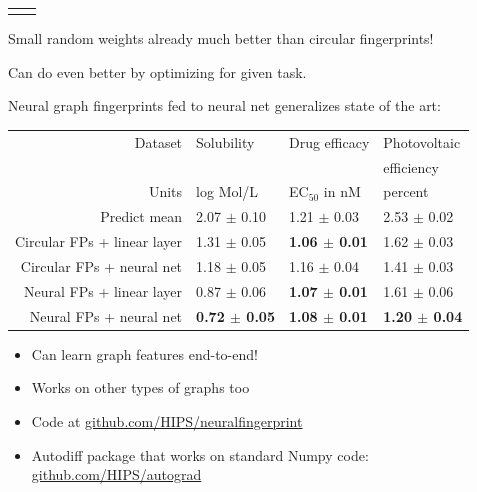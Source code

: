 \documentclass[landscape,a0b,final,a4resizeable]{include/a0poster}
\begin{document}
\begin{poster}
\begin{multicols}{3}
\begin{tabular}{cc}
\begin{minipage}[c]{0.48\columnwidth}
\begin{center}
\end{center}
\end{minipage}
\end{tabular}

\vspace{0.5em}

Small random weights already much better than circular fingerprints!

Can do even better by optimizing for given task.

\vspace{1in}


Neural graph fingerprints fed to neural net generalizes state of the art:%

\vspace{0.5em}

\begin{center}
\begin{tabular}{r|lll}
Dataset                      &   Solubility  & Drug efficacy & Photovoltaic \\
 & & & efficiency \\
\midrule
Units                        &   log Mol/L                            & EC$_{50}$ in nM                        & percent \\
\midrule
Predict mean                 & 2.07 $\pm$ 0.10        & 1.21 $\pm$ 0.03         & 2.53 $\pm$ 0.02 \\
Circular FPs + linear layer  & 1.31 $\pm$ 0.05        & \bf{1.06} $\pm$ 0.01    & 1.62 $\pm$ 0.03 \\
Circular FPs + neural net    & 1.18 $\pm$ 0.05        & 1.16 $\pm$ 0.04         & 1.41 $\pm$ 0.03 \\ 
Neural FPs + linear layer    & 0.87 $\pm$ 0.06        & \bf{1.07} $\pm$ 0.01    & 1.61 $\pm$ 0.06 \\  
Neural FPs + neural net      & \bf{0.72} $\pm$ 0.05   & \bf{1.08} $\pm$ 0.01    & \bf{1.20} $\pm$ 0.04
\end{tabular}

\vspace{0.5em}


\end{center}

\vspace{0.5em}


\begin{itemize}
\item Can learn graph features end-to-end!
\item Works on other types of graphs too 
\item Code at \url{github.com/HIPS/neuralfingerprint}
\item Autodiff package that works on standard Numpy code:\\ \url{github.com/HIPS/autograd}
\end{itemize}




\end{multicols}
\end{poster}
\end{document}
